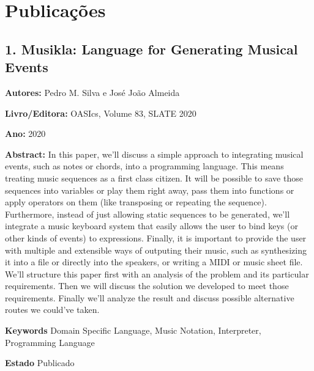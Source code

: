 \chapter{Publicações}

\section{1. Musikla: Language for Generating Musical Events}

{
\setlength{\parindent}{0cm}
\textbf{Autores:} Pedro M. Silva e José João Almeida

\textbf{Livro/Editora:} OASIcs, Volume 83, SLATE 2020

\textbf{Ano:} 2020

\textbf{Abstract:} In this paper, we'll discuss a simple approach to integrating musical events, such as notes or chords, into a programming language. This means treating music sequences as a first class citizen. It will be possible to save those sequences into variables or play them right away, pass them into functions or apply operators on them (like transposing or repeating the sequence). Furthermore, instead of just allowing static sequences to be generated, we'll integrate a music keyboard system that easily allows the user to bind keys (or other kinds of events) to expressions. Finally, it is important to provide the user with multiple and extensible ways of outputing their music, such as synthesizing it into a file or directly into the speakers, or writing a MIDI or music sheet file. We'll structure this paper first with an analysis of the problem and its particular requirements. Then we will discuss the solution we developed to meet those requirements. Finally we'll analyze the result and discuss possible alternative routes we could've taken.

\textbf{Keywords} Domain Specific Language, Music Notation, Interpreter, Programming Language

\textbf{Estado} Publicado
}
